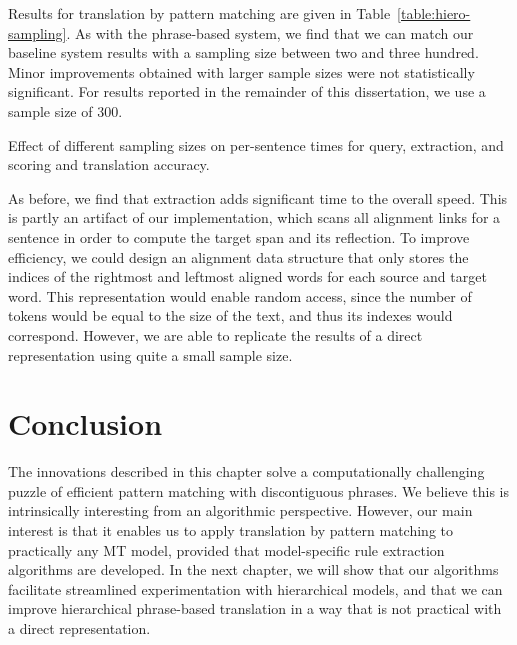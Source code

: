 Results for translation by pattern matching are given in 
Table~\ref{table:hiero-sampling}.  As with the phrase-based
system, we find that we can match our baseline system 
results with a sampling size between two and three hundred.
Minor improvements obtained with larger sample sizes were
not statistically significant.  For results reported in 
the remainder of this dissertation, we use a sample
size of 300.

\begin{table}
	\begin{center}
		
	\end{center}
	\caption{Effect of different sampling sizes on per-sentence times for query, extraction, and scoring and translation accuracy.}
	\label{table:hiero-sampling}
\end{table}

As before, we find that extraction adds significant time
to the overall speed.  This is partly an artifact of 
our implementation, which scans all alignment links for a sentence
in order to compute the target span and its reflection.  To
improve efficiency, we could design an alignment data structure
that only stores the indices of the rightmost and leftmost aligned words for 
each source and target word.  This representation would enable
random access, since the number of tokens would be equal to
the size of the text, and thus its indexes would correspond.
However, we are able to replicate the results of a direct representation
using quite a small sample size.

\section{Conclusion}\label{sec:algorithms-conclusions}

The innovations described in this chapter solve a computationally
challenging puzzle of efficient pattern matching with discontiguous
phrases.  We believe this is intrinsically
interesting from an algorithmic perspective.
However, our main interest is that it enables us to apply translation
by pattern matching to practically any MT model, provided 
that model-specific rule extraction algorithms are developed.  
In the next chapter, we will show that our algorithms facilitate
streamlined experimentation with hierarchical models, and that
we can improve hierarchical phrase-based translation in a
way that is not practical with a direct representation.



